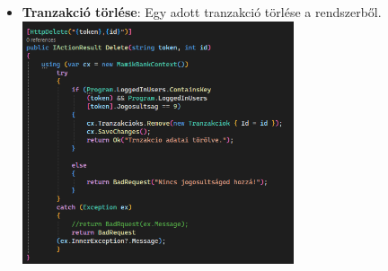 \documentclass[colorlinks]{thesis-kando}
\theoremstyle{definition}
\theoremstyle{remark}
\begin{document}
\begin{itemize}
\begin{itemize}
    \newpage
    \item \textbf{Tranzakció törlése}: Egy adott tranzakció törlése a rendszerből.
    \\
    \includegraphics[width=8cm]{figures/tranztorles.png}
\end{itemize}


\end{itemize}
\end{document}
